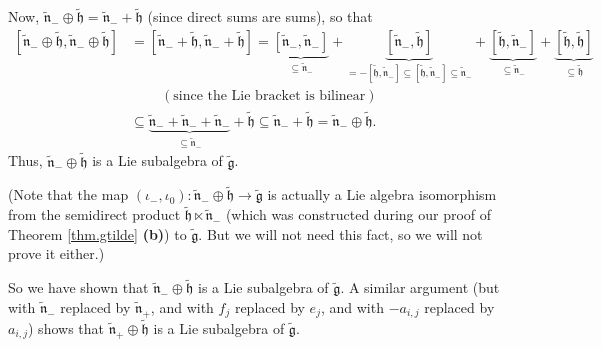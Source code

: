 \documentclass[etingof-lie.tex]{subfiles}
\begin{document}
\begin{verlong}
Now, $\widetilde{\mathfrak{n}}_{-}\oplus\widetilde{\mathfrak{h}}%
=\widetilde{\mathfrak{n}}_{-}+\widetilde{\mathfrak{h}}$ (since direct sums are
sums), so that
\begin{align*}
\left[  \widetilde{\mathfrak{n}}_{-}\oplus\widetilde{\mathfrak{h}%
},\widetilde{\mathfrak{n}}_{-}\oplus\widetilde{\mathfrak{h}}\right]   &
=\left[  \widetilde{\mathfrak{n}}_{-}+\widetilde{\mathfrak{h}}%
,\widetilde{\mathfrak{n}}_{-}+\widetilde{\mathfrak{h}}\right]
=\underbrace{\left[  \widetilde{\mathfrak{n}}_{-},\widetilde{\mathfrak{n}}%
_{-}\right]  }_{\subseteq\widetilde{\mathfrak{n}}_{-}}+\underbrace{\left[
\widetilde{\mathfrak{n}}_{-},\widetilde{\mathfrak{h}}\right]  }_{=-\left[
\widetilde{\mathfrak{h}},\widetilde{\mathfrak{n}}_{-}\right]  \subseteq\left[
\widetilde{\mathfrak{h}},\widetilde{\mathfrak{n}}_{-}\right]  \subseteq
\widetilde{\mathfrak{n}}_{-}}+\underbrace{\left[  \widetilde{\mathfrak{h}%
},\widetilde{\mathfrak{n}}_{-}\right]  }_{\subseteq\widetilde{\mathfrak{n}%
}_{-}}+\underbrace{\left[  \widetilde{\mathfrak{h}},\widetilde{\mathfrak{h}%
}\right]  }_{\subseteq\widetilde{\mathfrak{h}}}\\
&  \ \ \ \ \ \ \ \ \ \ \left(  \text{since the Lie bracket is bilinear}\right)
\\
&  \subseteq\underbrace{\widetilde{\mathfrak{n}}_{-}+\widetilde{\mathfrak{n}%
}_{-}+\widetilde{\mathfrak{n}}_{-}}_{\subseteq\widetilde{\mathfrak{n}}_{-}%
}+\widetilde{\mathfrak{h}}\subseteq\widetilde{\mathfrak{n}}_{-}%
+\widetilde{\mathfrak{h}}=\widetilde{\mathfrak{n}}_{-}\oplus
\widetilde{\mathfrak{h}}.
\end{align*}
Thus, $\widetilde{\mathfrak{n}}_{-}\oplus\widetilde{\mathfrak{h}}$ is a Lie
subalgebra of $\widetilde{\mathfrak{g}}$.
\end{verlong}

(Note that the map $\left(  \iota_{-},\iota_{0}\right)
:\widetilde{\mathfrak{n}}_{-}\oplus\widetilde{\mathfrak{h}}\rightarrow
\widetilde{\mathfrak{g}}$ is actually a Lie algebra isomorphism from the
semidirect product $\widetilde{\mathfrak{h}}\ltimes\widetilde{\mathfrak{n}%
}_{-}$ (which was constructed during our proof of Theorem \ref{thm.gtilde}
\textbf{(b)}) to $\widetilde{\mathfrak{g}}$. But we will not need this fact,
so we will not prove it either.)

So we have shown that $\widetilde{\mathfrak{n}}_{-}\oplus
\widetilde{\mathfrak{h}}$ is a Lie subalgebra of $\widetilde{\mathfrak{g}}$. A
similar argument (but with $\widetilde{\mathfrak{n}}_{-}$ replaced by
$\widetilde{\mathfrak{n}}_{+}$, and with $f_{j}$ replaced by $e_{j}$, and with
$-a_{i,j}$ replaced by $a_{i,j}$) shows that $\widetilde{\mathfrak{n}}%
_{+}\oplus\widetilde{\mathfrak{h}}$ is a Lie subalgebra of
$\widetilde{\mathfrak{g}}$.
\end{document}
